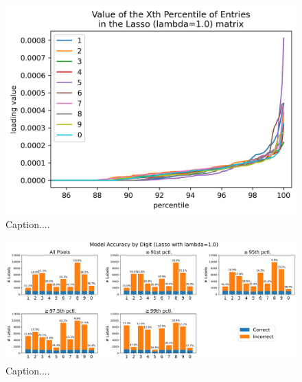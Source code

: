 \documentclass[10pt]{article}
\begin{document}
\begin{figure}[ht]
\centerline{\includegraphics[scale=0.9]{figures/DIGIT_lasso_loading_percentiles-see_uptick_at_91.png}}
\caption{Caption....}
\label{fig22}
\end{figure}

\begin{figure}[ht]
\centerline{\includegraphics[scale=0.5]{figures/DIGIT_PCTS_lasso_accuracy_comparison.png}}
\caption{Caption....}
\label{fig23}
\end{figure}
\end{document}
